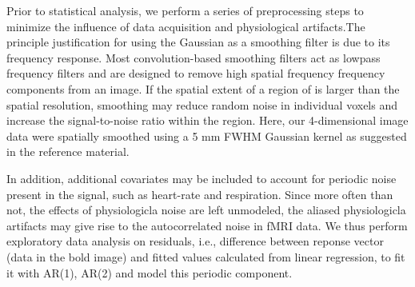 \par \indent Prior to statistical analysis, we perform a series of
preprocessing steps to minimize the influence of data acquisition and 
physiological artifacts.The principle justification for using the Gaussian as a 
smoothing filter is due to its frequency response. Most convolution-based 
smoothing filters act as lowpass frequency filters and are designed to remove 
high spatial frequency frequency components from an image. If the spatial 
extent of a region of is larger than the spatial resolution, smoothing may 
reduce random noise in individual voxels and increase the signal-to-noise ratio 
within the region. Here, our 4-dimensional image data  were spatially smoothed 
using a 5 mm FWHM Gaussian kernel as suggested in the reference material.
\par \indent In addition, additional covariates may be included to account for
periodic noise present in the signal, such as heart-rate and respiration. 
Since more often than not, the effects of physiologicla noise are left
unmodeled, the aliased physiologicla artifacts may give rise to the
autocorrelated noise in fMRI data. We thus perform exploratory data analysis on 
residuals, i.e., difference between reponse vector (data in the bold image) and 
fitted values calculated from linear regression, to fit it with AR(1), AR(2) 
and model this periodic component. 
